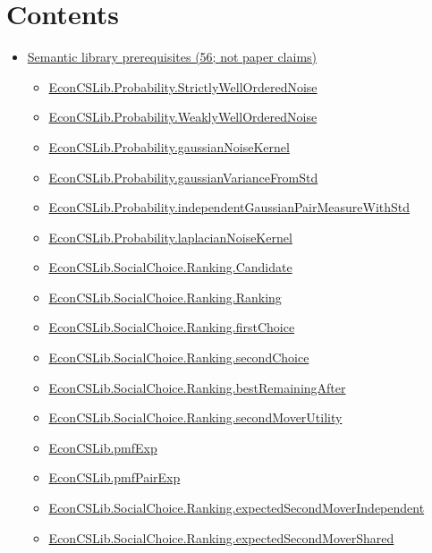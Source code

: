 \documentclass[10pt]{article}
\begin{document}
\section*{Contents}
\begin{itemize}[leftmargin=1.2em]
\item \hyperlink{library-section-227ed3312974d38f}{Semantic library prerequisites (56; not paper claims)}
\begin{itemize}[leftmargin=1.2em]
\item \hyperlink{library-prerequisite-f8200dc56888f8cf}{EconCSLib.Probability.StrictlyWellOrderedNoise}
\item \hyperlink{library-prerequisite-3ca32c22c4f1786f}{EconCSLib.Probability.WeaklyWellOrderedNoise}
\item \hyperlink{library-prerequisite-a80eaaa76d4081cc}{EconCSLib.Probability.gaussianNoiseKernel}
\item \hyperlink{library-prerequisite-d1924ea126b64a99}{EconCSLib.Probability.gaussianVarianceFromStd}
\item \hyperlink{library-prerequisite-96b93cedc528228b}{EconCSLib.Probability.independentGaussianPairMeasureWithStd}
\item \hyperlink{library-prerequisite-0f700e1385fe3352}{EconCSLib.Probability.laplacianNoiseKernel}
\item \hyperlink{library-prerequisite-dfa732ba2fb3e45a}{EconCSLib.SocialChoice.Ranking.Candidate}
\item \hyperlink{library-prerequisite-8f403b33d88960b7}{EconCSLib.SocialChoice.Ranking.Ranking}
\item \hyperlink{library-prerequisite-7b06b37dd64e13d0}{EconCSLib.SocialChoice.Ranking.firstChoice}
\item \hyperlink{library-prerequisite-2f14612a40825584}{EconCSLib.SocialChoice.Ranking.secondChoice}
\item \hyperlink{library-prerequisite-90e8cd1cdd9f27a4}{EconCSLib.SocialChoice.Ranking.bestRemainingAfter}
\item \hyperlink{library-prerequisite-2a2a10773f9fb97f}{EconCSLib.SocialChoice.Ranking.secondMoverUtility}
\item \hyperlink{library-prerequisite-e5c7eedc40c11b7a}{EconCSLib.pmfExp}
\item \hyperlink{library-prerequisite-8c5104efac7b45e2}{EconCSLib.pmfPairExp}
\item \hyperlink{library-prerequisite-79ca8c9a62821d3f}{EconCSLib.SocialChoice.Ranking.expectedSecondMoverIndependent}
\item \hyperlink{library-prerequisite-67c0534cc3c0f0cd}{EconCSLib.SocialChoice.Ranking.expectedSecondMoverShared}

\end{itemize}
\end{itemize}
\end{document}
